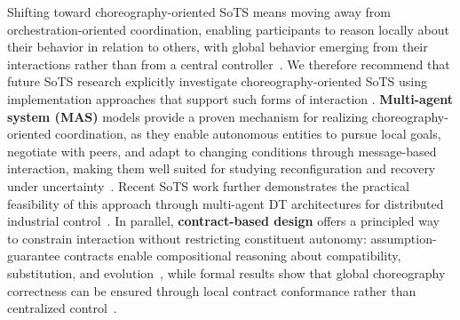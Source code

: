 Shifting toward choreography-oriented SoTS means moving away from orchestration-oriented coordination, enabling participants to reason locally about their behavior in relation to others, with global behavior emerging from their interactions rather than from a central controller~\cite{peltz2003web}. We therefore recommend that future SoTS research explicitly investigate choreography-oriented SoTS using implementation approaches that support such forms of interaction .
\textbf{Multi-agent system (MAS)} models provide a proven mechanism for realizing choreography-oriented coordination, as they enable autonomous entities to pursue local goals, negotiate with peers, and adapt to changing conditions through message-based interaction, making them well suited for studying reconfiguration and recovery under uncertainty~\cite{leite2013systematic}. Recent SoTS work further demonstrates the practical feasibility of this approach through multi-agent DT architectures for distributed industrial control~\cite{jirsa2024use}. In parallel, \textbf{contract-based design} offers a principled way to constrain interaction without restricting constituent autonomy: assumption-guarantee contracts enable compositional reasoning about compatibility, substitution, and evolution~\cite{benveniste2012contracts}, while formal results show that global choreography correctness can be ensured through local contract conformance rather than centralized control~\cite{bravetti2007towards}.






